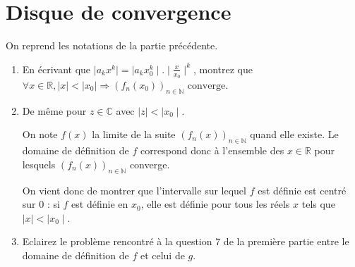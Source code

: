 \documentclass[10pt,a4paper]{article}
\begin{document}
\section{Disque de convergence}
On reprend les notations de la partie précédente.
\begin{enumerate}
\item En écrivant que $\mid a_k x^k\mid=\mid a_k x_0^k\mid.\mid\frac{x}{x_0}\mid^k$, montrez que $\forall x \in \mathbb{R}, \mid x\mid < \mid x_0\mid 
\Rightarrow (f_n(x_0))_{n\in\mathbb{N}} \text{ converge}$.
\item De même pour $z \in \mathbb{C}$ avec $\mid z\mid < \mid x_0\mid.$

On note $f(x)$ la limite de la suite $(f_n(x))_{n\in\mathbb{N}}$ quand elle existe. Le domaine de définition de $f$ correspond donc à l'ensemble des $x\in
\mathbb{R}$ pour lesquels $(f_n(x))_{n\in\mathbb{N}}$ converge.

On vient donc de montrer que l'intervalle sur lequel $f$ est définie est centré sur $0$ : si $f$ est définie en $x_0$, elle est définie pour tous les réels 
$x$ tels que $\mid x\mid<\mid x_0 \mid$.
\item Eclairez le problème rencontré à la question 7 de la première partie entre le domaine de définition de $f$ et celui de $g$.
\end{enumerate}
\end{document}
